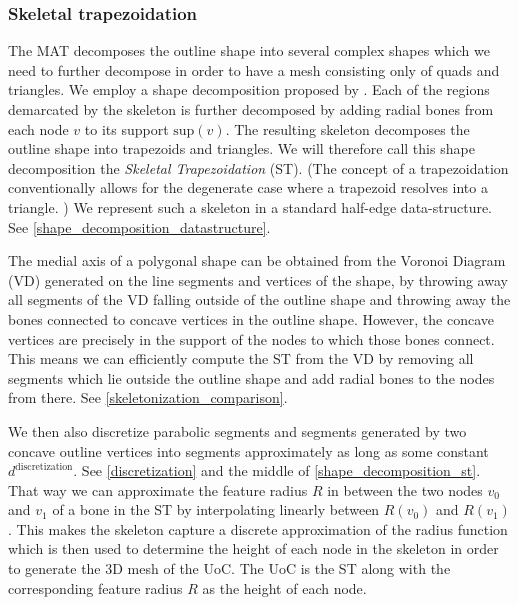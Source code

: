 \subsubsection{Skeletal trapezoidation}
The MAT decomposes the outline shape into several complex shapes which we need to further decompose in order to have a mesh consisting only of quads and triangles.
We employ a shape decomposition proposed by \citeauthor{Ding2016a}. \cite{Ding2016a}
Each of the regions demarcated by the skeleton is further decomposed by adding radial bones from each node $v$ to its support $\text{sup}(v)$.
The resulting skeleton decomposes the outline shape into trapezoids and triangles.
We will therefore call this shape decomposition the \emph{Skeletal Trapezoidation} (ST).
(The concept of a trapezoidation conventionally allows for the degenerate case where a trapezoid resolves into a triangle. \cite{chazelle1984,fournier1984})
We represent such a skeleton in a standard half-edge data-structure.
See \cref{shape_decomposition_datastructure}.


The medial axis of a polygonal shape can be obtained from the Voronoi Diagram (VD) generated on the line segments and vertices of the shape, by throwing away all segments of the VD falling outside of the outline shape and throwing away the bones connected to concave vertices in the outline shape. \cite{lee1982medial}
However, the concave vertices are precisely in the support of the nodes to which those bones connect.
This means we can efficiently compute the ST from the VD by removing all segments which lie outside the outline shape and add radial bones to the nodes from there.
See \cref{skeletonization_comparison}.


We then also discretize parabolic segments and segments generated by two concave outline vertices into segments approximately as long as some constant $d^\text{discretization}$.
See \cref{discretization} and the middle of \cref{shape_decomposition_st}.
That way we can approximate the feature radius $R$ in between the two nodes $v_0$ and $v_1$ of a bone in the ST by interpolating linearly between $R(v_0)$ and $R(v_1)$.
This makes the skeleton capture a discrete approximation of the radius function which is then used to determine the height of each node in the skeleton in order to generate the 3D mesh of the UoC.
The UoC is the ST along with the corresponding feature radius $R$ as the height of each node.


